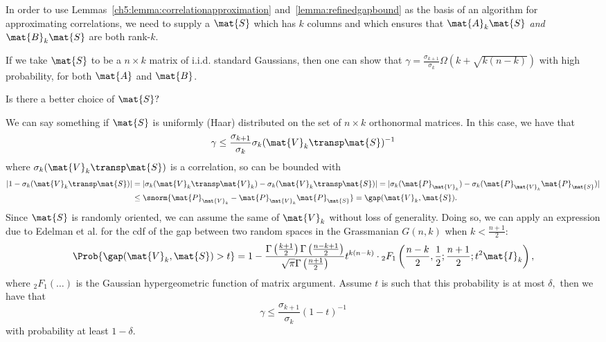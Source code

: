 \begin{remark}
In order to use Lemmas~\ref{ch5:lemma:correlationapproximation}
and~\ref{lemma:refinedgapbound} as the basis of an algorithm for approximating
correlations, we need to supply a $\mat{S}$ which has $k$ columns and which
ensures that $\mat{A}_k\mat{S}$ \emph{and} $\mat{B}_k \mat{S}$ are both
rank-$k.$ 

If we take $\mat{S}$ to be a $n \times k$ matrix of i.i.d. standard Gaussians,
then one can show that $\gamma = \frac{\sigma_{k+1}}{\sigma_k}\Omega(k + \sqrt{k
(n-k)})$ with high probability, for both $\mat{A}$ and $\mat{B}$.

Is there a better choice of $\mat{S}?$
\end{remark}

\begin{remark}
We can say something if $\mat{S}$ is uniformly (Haar) distributed on the set of
$n \times k$ orthonormal matrices. In this case, we have that
\[
\gamma \leq \frac{\sigma_{k+1}}{\sigma_k} \sigma_k(\mat{V}_k\transp
\mat{S})^{-1}
\]
where $\sigma_k(\mat{V}_k\transp \mat{S})$ is a correlation, so can be bounded
with
\begin{align*}
|1 - \sigma_k(\mat{V}_k\transp \mat{S})| & = |\sigma_k(\mat{V}_k\transp
\mat{V}_k) - \sigma_k(\mat{V}_k\transp \mat{S})| =
|\sigma_k(\mat{P}_{\mat{V}_k}) - \sigma_k(\mat{P}_{\mat{V}_k}
\mat{P}_{\mat{S}})| \\
 & \leq \snorm{\mat{P}_{\mat{V}_k} - \mat{P}_{\mat{V}_k} \mat{P}_{\mat{S}}} =
\gap(\mat{V}_k, \mat{S}).
\end{align*}
Since $\mat{S}$ is randomly oriented, we can assume the same of $\mat{V}_k$
without loss of generality. Doing so, we can apply an expression due to Edelman
et al. for the cdf of the gap between two random spaces in the Grassmanian
$G(n,k)$ when $k < \frac{n+1}{2}$:
\[
\Prob{ \gap(\mat{V}_k, \mat{S}) > t} = 1 -
\frac{\Gamma\left(\frac{k+1}{2}\right)\Gamma\left(\frac{n-k+1}{2}\right)}{\sqrt{
\pi}\Gamma\left(\tfrac{n+1}{2}\right)} t^{k(n-k)} \cdot
{}_2F_1\left(\frac{n-k}{2}, \frac{1}{2}; \frac{n+1}{2}; t^2 \mat{I}_k \right),
\]
where ${}_2F_1(\ldots)$ is the Gaussian hypergeometric function of matrix
argument. Assume $t$ is such that this probability is at most $\delta,$ then we
have that
\[
\gamma \leq \frac{\sigma_{k+1}}{\sigma_k} (1 - t)^{-1}
\]
with probability at least $1 - \delta.$

\end{remark}

